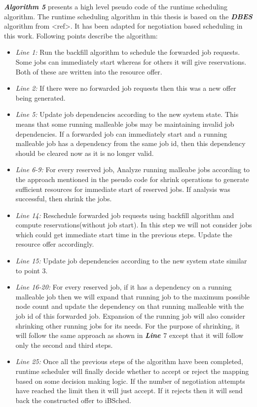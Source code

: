 \textbf{\textit{Algorithm 5}} presents a high level pseudo code of the runtime scheduling algorithm. The runtime scheduling algorithm in this thesis is based on the \textbf{\textit{DBES}} algorithm from <ref>. It has been adapted for negotiation based scheduling in this work. Following points describe the algorithm:
\begin{itemize}
\item \textit{Line 1:} Run the backfill algorithm to schedule the forwarded job requests. Some jobs can immediately start whereas for others it will give reservations. Both of these are written into the resource offer.
\item \textit{Line 2:} If there were no forwarded job requests then this was a new offer being generated.
\item \textit{Line 5:} Update job dependencies according to the new system state. This means that some running malleable jobs may be maintaining invalid job dependencies. If a forwarded job can immediately start and a running malleable job has a dependency from the same job id, then this dependency should be cleared now as it is no longer valid. 
\item \textit{Line 6-9:} For every reserved job, Analyze running malleabe jobs according to the approach mentioned in the pseudo code for shrink operations to generate sufficient resources for immediate start of reserved jobs. If analysis was successful, then shrink the jobs.
\item \textit{Line 14:} Reschedule forwarded job requests using backfill algorithm and compute reservations(without job start). In this step we will not consider jobs which could get immediate start time in the previous steps. Update the resource offer accordingly.
\item \textit{Line 15:} Update job dependencies according to the new system state similar to point $3$.
\item \textit{Line 16-20:} For every reserved job, if it has a dependency on a running malleable job then we will expand that running job to the maximum possible node count and update the dependency on that running malleable with the job id of this forwarded job. Expansion of the running job will also consider shrinking other running jobs for its needs. For the purpose of shrinking, it will follow the same approach as shown in \textbf{\textit{Line $7$}} except that it will follow only the second and third steps.
\item \textit{Line 25:} Once all the previous steps of the algorithm have been completed, runtime scheduler will finally decide whether to accept or reject the mapping based on some decision making logic. If the number of negotiation attempts have reached the limit then it will just accept. If it rejects then it will send back the constructed offer to iBSched.
\end{itemize}
